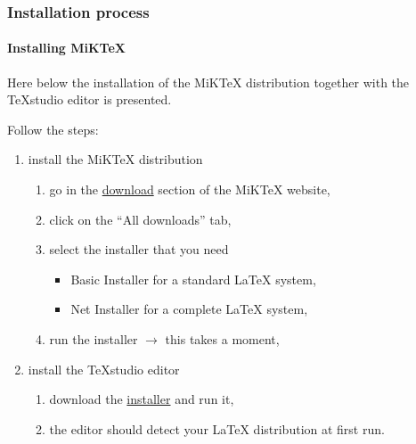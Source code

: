 \documentclass[11pt]{beamer}
\begin{document}
\begin{frame}
	\frametitle{Installation process}
	\framesubtitle{Installing MiK\TeX{}}
	
	Here below the installation of the MiK\TeX{} distribution together with the \TeX{}studio editor is presented.
	
	Follow the steps:
	\begin{enumerate}
		\item install the MiK\TeX{} distribution
		\begin{enumerate}
			\item go in the \href{https://miktex.org/download}{download} section of the MiK\TeX{} website,
			\item click on the \enquote{All downloads} tab,
			\item select the installer that you need
			\begin{itemize}
				\item Basic Installer for a standard \LaTeX{} system,
				\item Net Installer for a complete \LaTeX{} system,
			\end{itemize}
			\item run the installer $\rightarrow$ this takes a moment,
		\end{enumerate}
		\item install the \TeX{}studio editor
		\begin{enumerate}
			\item download the \href{https://www.texstudio.org/}{installer} and run it,
			\item the editor should detect your \LaTeX{} distribution at first run.
		\end{enumerate}	
	\end{enumerate}
\end{frame}

 
\end{document}
